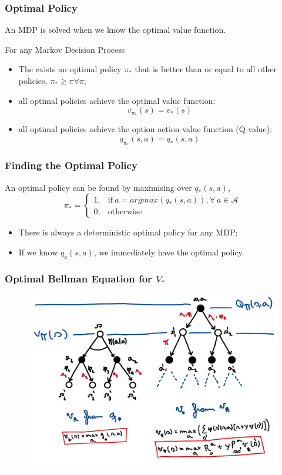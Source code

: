 \begin{frame}
    \frametitle{Optimal Policy}
    \centering
    An MDP is solved when we know the optimal value function.
    \begin{definition}
        For any Markov Decision Process
        \begin{itemize}
            \item The exists an optimal policy $\pi_{*}$ that is better than
            or equal to all other policies, $\pi_{*} \geqslant \pi \forall\pi$;
            \item all optimal policies achieve the optimal value function:
            $$v_{\pi_{*}}(s) = v_{*}(s)$$
            \item all optimal policies achieve the option action-value function (Q-value):
            $$q_{\pi_{*}}(s,a) = q_{*}(s,a)$$
        \end{itemize}
    \end{definition}
\end{frame}



\begin{frame}
    \frametitle{Finding the Optimal Policy}
    An optimal policy can be found by maximising over $q_{*}(s,a)$,
    $$\pi_{*} =  \begin{cases}
        1, & \text{if}\ a=argmax(q_{*}(s,a)), \forall~a\in\mathcal{A}\\
        0, & \text{otherwise}
      \end{cases}$$

    \begin{itemize}
        \item There is always a {\color{red}deterministic} optimal policy for any MDP;
        \item If we know $q_{a}(s,a)$, we immediately have the optimal policy. 
    \end{itemize}
\end{frame}


\begin{frame}
    \frametitle{Optimal Bellman Equation for $V_{*}$}
    \begin{figure}
        \centering
        \includegraphics[width=1\textwidth]{sections/markov/figures/v_star.pdf}
    \end{figure}
\end{frame}



